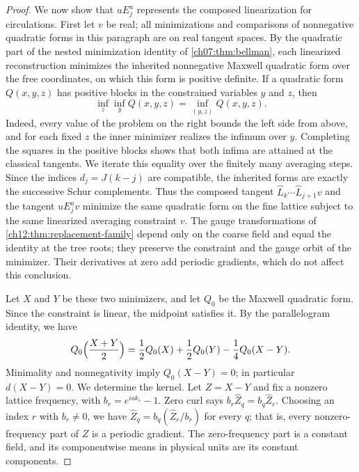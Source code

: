 \begin{proof}
We now show that $uE_j^a$ represents the composed linearization for circulations. First let $v$ be real; all minimizations and comparisons of nonnegative quadratic forms in this paragraph are on real tangent spaces. By the quadratic part of the nested minimization identity of \cref{ch07:thm:bellman}, each linearized reconstruction minimizes the inherited nonnegative Maxwell quadratic form over the free coordinates, on which this form is positive definite. If a quadratic form $Q(x,y,z)$ has positive blocks in the constrained variables $y$ and $z$, then
\[
 \inf_z\inf_yQ(x,y,z)=\inf_{(y,z)}Q(x,y,z).
\]
Indeed, every value of the problem on the right bounds the left side from above, and for each fixed $z$ the inner minimizer realizes the infimum over $y$. Completing the squares in the positive blocks shows that both infima are attained at the classical tangents. We iterate this equality over the finitely many averaging steps. Since the indices $d_j=J(k-j)$ are compatible, the inherited forms are exactly the successive Schur complements. Thus the composed tangent $\widehat L_k\cdots\widehat L_{j+1}v$ and the tangent $uE_j^av$ minimize the same quadratic form on the fine lattice subject to the same linearized averaging constraint $v$. The gauge transformations of \cref{ch12:thm:replacement-family} depend only on the coarse field and equal the identity at the tree roots; they preserve the constraint and the gauge orbit of the minimizer. Their derivatives at zero add periodic gradients, which do not affect this conclusion.

Let $X$ and $Y$ be these two minimizers, and let $Q_0$ be the Maxwell quadratic form. Since the constraint is linear, the midpoint satisfies it. By the parallelogram identity, we have
\[
 Q_0\Bigl(\frac{X+Y}2\Bigr)=\frac12Q_0(X)+\frac12Q_0(Y)-\frac14Q_0(X-Y).
\]
Minimality and nonnegativity imply $Q_0(X-Y)=0$; in particular $d(X-Y)=0$. We determine the kernel. Let $Z=X-Y$ and fix a nonzero lattice frequency, with $b_r=e^{iak_r}-1$. Zero curl says $b_r\widehat Z_q=b_q\widehat Z_r$. Choosing an index $r$ with $b_r\ne0$, we have $\widehat Z_q=b_q(\widehat Z_r/b_r)$ for every $q$; that is, every nonzero-frequency part of $Z$ is a periodic gradient. The zero-frequency part is a constant field, and its componentwise means in physical units are its constant components.


\end{proof}
